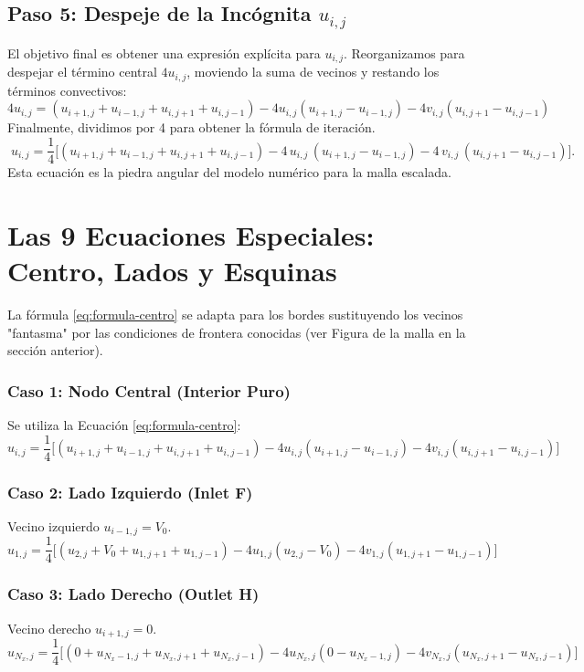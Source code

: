 \documentclass[11pt,letterpaper]{article}
\newcommand{\ux}{u}             %
\newcommand{\vyc}{v}            %
\begin{document}
\subsection{Paso 5: Despeje de la Incógnita $\ux_{i,j}$}
El objetivo final es obtener una expresión explícita para $\ux_{i,j}$. Reorganizamos para despejar el término central $4\ux_{i,j}$, moviendo la suma de vecinos y restando los términos convectivos:
\[
4\ux_{i,j} = (\ux_{i+1,j}+\ux_{i-1,j}+\ux_{i,j+1}+\ux_{i,j-1}) - 4\ux_{i,j}(\ux_{i+1,j}-\ux_{i-1,j}) - 4\vyc_{i,j}(\ux_{i,j+1}-\ux_{i,j-1})
\]
Finalmente, dividimos por 4 para obtener la fórmula de iteración. 
\begin{equation}
\boxed{\;
\ux_{i,j}=\frac{1}{4}\Big[
\left(\ux_{i+1,j}+\ux_{i-1,j}+\ux_{i,j+1}+\ux_{i,j-1}\right)
- 4\,\ux_{i,j}\,(\ux_{i+1,j}-\ux_{i-1,j})
- 4\,\vyc_{i,j}\,(\ux_{i,j+1}-\ux_{i,j-1})
\Big]. \;} 
\label{eq:formula-centro}
\end{equation}
Esta ecuación es la piedra angular del modelo numérico para la malla escalada.

\newpage
\section{Las 9 Ecuaciones Especiales: Centro, Lados y Esquinas}
La fórmula \cref{eq:formula-centro} se adapta para los bordes sustituyendo los vecinos "fantasma" por las condiciones de frontera conocidas (ver Figura de la malla en la sección anterior).

\subsubsection{Caso 1: Nodo Central (Interior Puro)}
Se utiliza la Ecuación \ref{eq:formula-centro}:
\[
\ux_{i,j}=\frac{1}{4}\Big[ (\ux_{i+1,j}+\ux_{i-1,j}+\ux_{i,j+1}+\ux_{i,j-1})
- 4\ux_{i,j}(\ux_{i+1,j}-\ux_{i-1,j})
- 4\vyc_{i,j}(\ux_{i,j+1}-\ux_{i,j-1}) \Big]
\]

\subsubsection{Caso 2: Lado Izquierdo (Inlet F)}
Vecino izquierdo $\ux_{i-1,j} = V_0$.
\[
\ux_{1,j}=\frac{1}{4}\Big[ (\ux_{2,j}+V_0+\ux_{1,j+1}+\ux_{1,j-1})
- 4\ux_{1,j}(\ux_{2,j}-V_0)
- 4\vyc_{1,j}(\ux_{1,j+1}-\ux_{1,j-1}) \Big]
\]

\subsubsection{Caso 3: Lado Derecho (Outlet H)}
Vecino derecho $\ux_{i+1,j} = 0$.
\[
\ux_{N_x,j}=\frac{1}{4}\Big[ (0+\ux_{N_x-1,j}+\ux_{N_x,j+1}+\ux_{N_x,j-1})
- 4\ux_{N_x,j}(0-\ux_{N_x-1,j})
- 4\vyc_{N_x,j}(\ux_{N_x,j+1}-\ux_{N_x,j-1}) \Big]
\]
\end{document}
